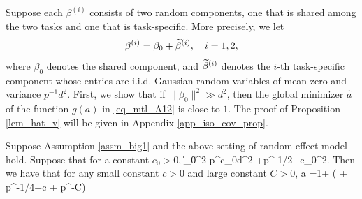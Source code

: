 \begin{example}%
\label{ex_sample_ratio}
	Suppose each $\beta^{(i)}$ consists of two random components, one that is shared among the two tasks and one that is task-specific. More precisely, we let
$$\beta^{(i)}=\beta_0 +\widetilde \beta^{(i)},\quad i=1,2, $$
where $\beta_0$ denotes the shared component, %
and $\widetilde \beta^{(i)}$ denotes the $i$-th
task-specific component whose entries are i.i.d. Gaussian random variables of mean zero and variance $p^{-1} d^2$. First, we show that if $\|\beta_0\|^2 \gg d^2$, then the global minimizer $\hat a$ of the function $g(a)$ in \eqref{eq_mtl_A12} is close to $1$.
	The proof of Proposition \ref{lem_hat_v} will be given in Appendix \ref{app_iso_cov_prop}.

	\begin{proposition}\label{lem_hat_v}
Suppose Assumption \ref{assm_big1} and the above setting of random effect model hold. %
Suppose that for a constant $c_0>0$,
	\be\label{para_rel}
	 \|\beta_0\|^2 \ge p^{c_0}d^2 +p^{-1/2+c_0}\sigma^2.
	\ee
 Then we have that for any small constant $c>0$ and large constant $ C>0$,
	\be\label{hatw_add1}
	 \hat a =1+ \OO\left( + p^{-1/4+c}  + p^{-C}\right) \quad {}
	\ee
\end{proposition}


\end{example}
